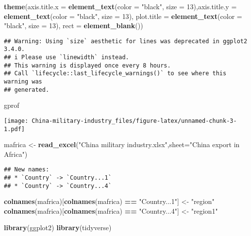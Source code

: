 \documentclass[
]{article}
\newenvironment{Shaded}{\begin{snugshade}}{\end{snugshade}}
\newcommand{\AttributeTok}[1]{\textcolor[rgb]{0.13,0.29,0.53}{#1}}
\newcommand{\DecValTok}[1]{\textcolor[rgb]{0.00,0.00,0.81}{#1}}
\newcommand{\FunctionTok}[1]{\textcolor[rgb]{0.13,0.29,0.53}{\textbf{#1}}}
\newcommand{\NormalTok}[1]{#1}
\newcommand{\OtherTok}[1]{\textcolor[rgb]{0.56,0.35,0.01}{#1}}
\newcommand{\SpecialCharTok}[1]{\textcolor[rgb]{0.81,0.36,0.00}{\textbf{#1}}}
\newcommand{\StringTok}[1]{\textcolor[rgb]{0.31,0.60,0.02}{#1}}
\begin{document}
\begin{Shaded}
\begin{Highlighting}[]
    \FunctionTok{theme}\NormalTok{(}\AttributeTok{axis.title.x =} \FunctionTok{element\_text}\NormalTok{(}\AttributeTok{color =} \StringTok{"black"}\NormalTok{, }\AttributeTok{size =} \DecValTok{13}\NormalTok{),}\AttributeTok{axis.title.y =} \FunctionTok{element\_text}\NormalTok{(}\AttributeTok{color =} \StringTok{"black"}\NormalTok{, }\AttributeTok{size =} \DecValTok{13}\NormalTok{), }\AttributeTok{plot.title =} \FunctionTok{element\_text}\NormalTok{(}\AttributeTok{color =} \StringTok{"black"}\NormalTok{, }\AttributeTok{size =} \DecValTok{13}\NormalTok{), }\AttributeTok{rect =} \FunctionTok{element\_blank}\NormalTok{())}
\end{Highlighting}
\end{Shaded}

\begin{verbatim}
## Warning: Using `size` aesthetic for lines was deprecated in ggplot2 3.4.0.
## i Please use `linewidth` instead.
## This warning is displayed once every 8 hours.
## Call `lifecycle::last_lifecycle_warnings()` to see where this warning was
## generated.
\end{verbatim}

\begin{Shaded}
\begin{Highlighting}[]
\NormalTok{gprof}
\end{Highlighting}
\end{Shaded}

\texttt{[image: China-military-industry\_files/figure-latex/unnamed-chunk-3-1.pdf]}

\begin{Shaded}
\begin{Highlighting}[]
\NormalTok{mafrica }\OtherTok{\textless{}{-}} \FunctionTok{read\_excel}\NormalTok{(}\StringTok{"China military industry.xlsx"}\NormalTok{,}\AttributeTok{sheet=}\StringTok{"China export in Africa"}\NormalTok{)}
\end{Highlighting}
\end{Shaded}

\begin{verbatim}
## New names:
## * `Country` -> `Country...1`
## * `Country` -> `Country...4`
\end{verbatim}

\begin{Shaded}
\begin{Highlighting}[]
\FunctionTok{colnames}\NormalTok{(mafrica)[}\FunctionTok{colnames}\NormalTok{(mafrica) }\SpecialCharTok{==} \StringTok{"Country...1"}\NormalTok{] }\OtherTok{\textless{}{-}} \StringTok{"region"}
\FunctionTok{colnames}\NormalTok{(mafrica)[}\FunctionTok{colnames}\NormalTok{(mafrica) }\SpecialCharTok{==} \StringTok{"Country...4"}\NormalTok{] }\OtherTok{\textless{}{-}} \StringTok{"region1"}

\FunctionTok{library}\NormalTok{(ggplot2)}
\FunctionTok{library}\NormalTok{(tidyverse)}
\end{Highlighting}
\end{Shaded}
\end{document}
